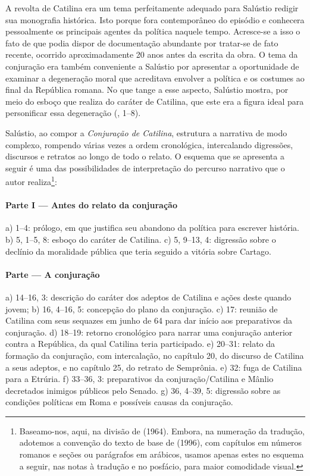 A revolta de Catilina era um tema perfeitamente adequado para Salústio redigir
sua monografia histórica. Isto porque fora contemporâneo do episódio e
conhecera pessoalmente os principais agentes da política naquele tempo.
Acresce-se a isso o fato de que podia dispor de documentação abundante por
tratar-se de fato recente, ocorrido aproximadamente 20 anos antes da escrita da
obra. O tema da conjuração era também conveniente a Salústio por apresentar a
oportunidade de examinar a degeneração moral que acreditava envolver a política
e os costumes ao final da República romana. No que tange a esse aspecto,
Salústio mostra, por meio do esboço que realiza do caráter de Catilina, que
este era a figura ideal para personificar essa degeneração (, 1--8).

Salústio, ao compor a \emph{Conjuração de Catilina}, estrutura a narrativa de modo
complexo, rompendo várias vezes a ordem cronológica, intercalando digressões,
discursos e retratos ao longo de todo o relato. O esquema que se apresenta a
seguir é uma das possibilidades de interpretação do percurso narrativo que o
autor realiza\footnote{Baseamo-nos, aqui, na divisão de  (1964). Embora, na numeração da tradução, adotemos a convenção do texto de base de  (1996), com capítulos em números romanos e seções ou parágrafos em arábicos, usamos apenas estes no esquema a seguir, nas notas à tradução e no posfácio, para maior comodidade visual.}:  

\paragraph{Parte I --- Antes do relato da conjuração}

a)	1--4: prólogo, em que justifica seu abandono da política para escrever
história.  b)	5, 1--5, 8: esboço do caráter de Catilina.  c)	5, 9--13, 4:
digressão sobre o declínio da moralidade pública que teria seguido a vitória
sobre Cartago. 

\paragraph{Parte  --- A conjuração}

a)	14--16, 3: descrição do caráter dos adeptos de Catilina e ações deste
quando jovem; b)	16, 4--16, 5: concepção do plano da conjuração.  c) 	17:
reunião de Catilina com seus sequazes em junho de 64 para dar início aos preparativos 
da conjuração.  d)	18--19: retorno cronológico para narrar uma conjuração
anterior contra a República, da qual Catilina teria participado.  e)	20--31:
relato da formação da conjuração, com intercalação, no capítulo 20, do discurso
de Catilina a seus adeptos, e no capítulo 25, do retrato de Semprônia.  e)
32:  fuga de Catilina para a Etrúria.  f)	33--36, 3: preparativos da
conjuração/Catilina e Mânlio decretados inimigos públicos pelo Senado.  g)
36, 4--39, 5: digressão sobre as condições políticas em Roma e possíveis causas
da conjuração.	 	

